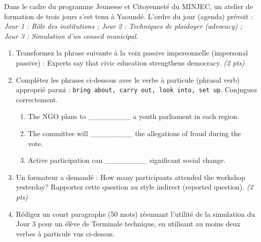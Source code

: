 \documentclass[11pt]{article}
\begin{document}
\begin{exercice}
Dans le cadre du programme \og Jeunesse et Citoyenneté \fg{} du MINJEC, un atelier de formation de trois jours s'est tenu à Yaoundé. L'ordre du jour (agenda) prévoit : \textit{Jour 1 : Rôle des institutions ; Jour 2 : Techniques de plaidoyer (advocacy) ; Jour 3 : Simulation d'un conseil municipal.}

\begin{enumerate}
\item Transformez la phrase suivante à la voix passive impersonnelle (impersonal passive) : \og Experts say that civic education strengthens democracy.\fg{} \textit{(2 pts)}
\item Complétez les phrases ci-dessous avec le verbe à particule (phrasal verb) approprié parmi : \texttt{bring about, carry out, look into, set up}. Conjuguez correctement.
\begin{enumerate}
\item The NGO plans to \_\_\_\_\_\_\_\_ a youth parliament in each region.
\item The committee will \_\_\_\_\_\_\_\_ the allegations of fraud during the vote.
\item Active participation can \_\_\_\_\_\_\_\_ significant social change.
\end{enumerate}
\item Un formateur a demandé : \og How many participants attended the workshop yesterday?\fg{} Rapportez cette question au style indirect (reported question). \textit{(2 pts)}
\item Rédigez un court paragraphe (50 mots) résumant l'utilité de la simulation du Jour 3 pour un élève de Terminale technique, en utilisant au moins deux verbes à particule vus ci-dessus.
\end{enumerate}
\end{exercice}
\end{document}
